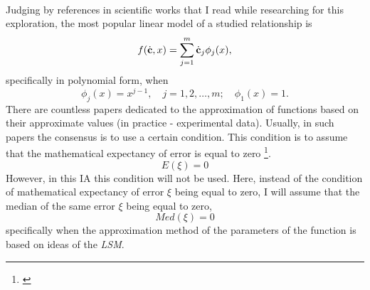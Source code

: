 \\
Judging by references in scientific works that I read while researching for this exploration, the most popular linear model of a studied relationship is
\begin{equation}
f(\dot{\textbf{c}},x)= \sum\limits_{j=1}^{m} \dot{\textbf{c}}_{j} \phi_{j}(x), \label{functionform}
\end{equation}
specifically in polynomial form, when
\begin{equation}
\phi_{j}(x)=x^{j-1},\quad j=1,2,\dots,m; \quad \phi_{1}(x) = 1.
\end{equation}
There are countless papers dedicated to the approximation of functions based on their approximate values (in practice - experimental data). Usually, in such papers the consensus is to use a certain condition. This condition is to assume that the mathematical expectancy of error is equal to zero \footnote{\cite{Plackett_1950}}.
\begin{equation}
E(\xi)=0
\end{equation}
 However, in this IA this condition will not be used. Here, instead of the condition of mathematical expectancy of error $\xi$ being equal to zero, I will assume that the median of the same error $\xi$ being equal to zero, 
\begin{equation}
Med(\xi)=0
\end{equation}
specifically when the approximation method of the parameters of the function is based on ideas of the \textit{LSM}. \\

